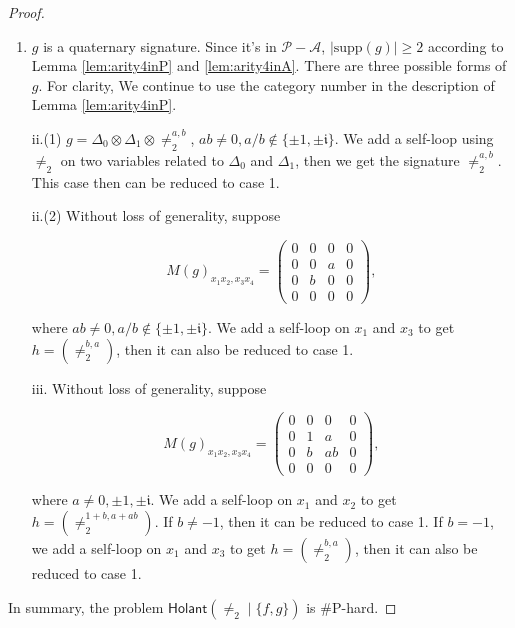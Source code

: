 \documentclass[a4paper,UKenglish,cleveref, autoref, thm-restate]{lipics-v2021}
\newcommand{\bi}[2]{\neq_2^{#1,#2}}
\newcommand{\hol}[0]{\textsf{Holant}}
\newcommand{\su}[0]{\text{supp}}
\begin{document}
\begin{proof}
\begin{enumerate}
\item $g$ is a quaternary signature. Since it's in $\mathscr{P}-\mathscr{A}$, $|\su(g)|\geq 2$ according to Lemma \ref{lem:arity4inP} and \ref{lem:arity4inA}.
There are three possible forms of $g$. For clarity, We continue to use the category number in the description of Lemma \ref{lem:arity4inP}. 

ii.(1) $g=\Delta_0\otimes\Delta_1\otimes\neq_2^{a,b}$, $ab\neq0,a/b\notin\{\pm1,\pm \mathfrak{i}\}$. We add a self-loop using $\neq_2$ on two variables related to $\Delta_0$ and $\Delta_1$, then we get the signature $\neq_2^{a,b}$. This case then can be reduced to case 1.

ii.(2) Without loss of generality, suppose

$$M(g)_{x_1x_2,x_3x_4}=\left(\begin{array}{cccc}
0 & 0 & 0 & 0\\
0 & 0 & a & 0\\
0 & b & 0 & 0\\
0 & 0 & 0 & 0
\end{array} 
\right),$$

where $ab\neq0,a/b\notin\{\pm1,\pm\mathfrak{i}\}$. We add a self-loop on $x_1$ and $x_3$ to get $h=(\bi{b}{a})$, then it can also be reduced to case 1.

iii. Without loss of generality, suppose 

$$M(g)_{x_1x_2,x_3x_4}=\left(\begin{array}{cccc}
0 & 0 & 0 & 0\\
0 & 1 & a & 0\\
0 & b & ab & 0\\
0 & 0 & 0 & 0
\end{array} 
\right),$$

where $a\neq 0,\pm1,\pm \mathfrak{i}$. We add a self-loop on $x_1$ and $x_2$ to get $h=(\bi{1+b}{a+ab})$. If $b\neq -1$, then it can be reduced to case 1. If $b=-1$, we add a self-loop on $x_1$ and $x_3$ to get $h=(\bi{b}{a})$, then it can also be reduced to case 1.
\end{enumerate}

In summary, the problem $\hol(\neq_2\mid\{f,g\})$ is \#P-hard.
\end{proof}
\end{document}
